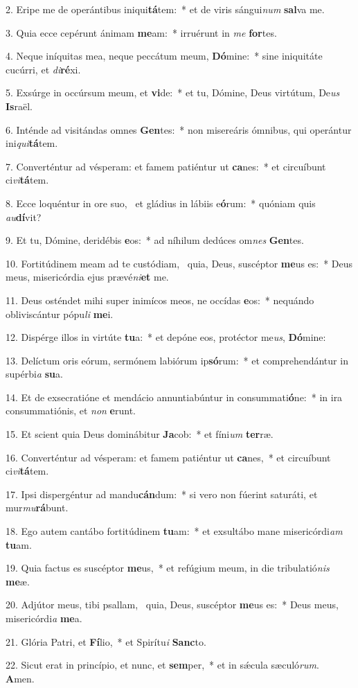 2. Eripe me de operántibus iniqui\textbf{tá}tem:~*  et de viris sángui\textit{num} \textbf{sal}va me.\

3. Quia ecce cepérunt ánimam \textbf{me}am:~*  irruérunt in \textit{me} \textbf{for}tes.\

4. Neque iníquitas mea, neque peccátum meum, \textbf{Dó}mine:~*  sine iniquitáte cucúrri, et \textit{di}\textbf{ré}xi.\

5. Exsúrge in occúrsum meum, et \textbf{vi}de:~*  et tu, Dómine, Deus virtútum, De\textit{us} \textbf{Is}raël.\

6. Inténde ad visitándas omnes \textbf{Gen}tes:~*  non misereáris ómnibus, qui operántur ini\textit{qui}\textbf{tá}tem.\

7. Converténtur ad vésperam: et famem patiéntur ut \textbf{ca}nes:~*  et circuíbunt ci\textit{vi}\textbf{tá}tem.\

8. Ecce loquéntur in ore suo, \dag\  et gládius in lábiis e\textbf{ó}rum:~*  quóniam quis \textit{au}\textbf{dí}vit?\

9. Et tu, Dómine, deridébis \textbf{e}os:~*  ad níhilum dedúces om\textit{nes} \textbf{Gen}tes.\

10. Fortitúdinem meam ad te custódiam, \dag\  quia, Deus, suscéptor \textbf{me}us es:~*  Deus meus, misericórdia ejus prævé\textit{ni}\textbf{et} me.\

11. Deus osténdet mihi super inimícos meos, ne occídas \textbf{e}os:~*  nequándo obliviscántur pópu\textit{li} \textbf{me}i.\

12. Dispérge illos in virtúte \textbf{tu}a:~*  et depóne eos, protéctor me\textit{us}, \textbf{Dó}mine:\

13. Delíctum oris eórum, sermónem labiórum ip\textbf{só}rum:~*  et comprehendántur in supérbi\textit{a} \textbf{su}a.\

14. Et de exsecratióne et mendácio annuntiabúntur in consummati\textbf{ó}ne:~*  in ira consummatiónis, et \textit{non} \textbf{e}runt.\

15. Et scient quia Deus dominábitur \textbf{Ja}cob:~*  et fíni\textit{um} \textbf{ter}ræ.\

16. Converténtur ad vésperam: et famem patiéntur ut \textbf{ca}nes,~*  et circuíbunt ci\textit{vi}\textbf{tá}tem.\

17. Ipsi dispergéntur ad mandu\textbf{cán}dum:~*  si vero non fúerint saturáti, et mur\textit{mu}\textbf{rá}bunt.\

18. Ego autem cantábo fortitúdinem \textbf{tu}am:~*  et exsultábo mane misericórdi\textit{am} \textbf{tu}am.\

19. Quia factus es suscéptor \textbf{me}us,~*  et refúgium meum, in die tribulatió\textit{nis} \textbf{me}æ.\

20. Adjútor meus, tibi psallam, \dag\  quia, Deus, suscéptor \textbf{me}us es:~*  Deus meus, misericórdi\textit{a} \textbf{me}a.\

21. Glória Patri, et \textbf{Fí}lio,~*  et Spirítu\textit{i} \textbf{Sanc}to.\

22. Sicut erat in princípio, et nunc, et \textbf{sem}per,~*  et in sǽcula sæculó\textit{rum}. \textbf{A}men.\

